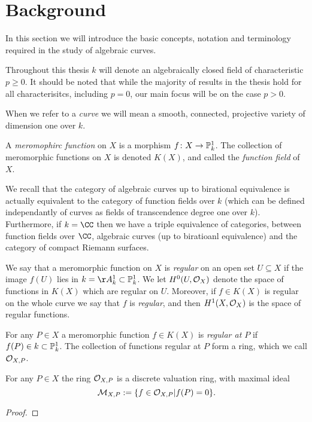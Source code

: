 \chapter{Background}\label{chapterbackground}

In this section we will introduce the basic concepts, notation and terminology required in the study of algebraic curves.

Throughout this thesis $k$ will denote an algebraically closed field of characteristic $p \geq 0$.
It should be noted that while the majority of results in the thesis hold for all characterisitcs, including $p=0$, our main focus will be on the case $p > 0$.

When we refer to a \emph{curve} we will mean a smooth, connected, projective variety of dimension one over $k$.


A \emph{meromophirc function} on $X$ is a morphism $f \colon X \rightarrow {\mathbb P}_k^1$.
The collection of meromorphic functions on $X$ is denoted $K(X)$, and called the \emph{function field} of $X$.

We recall that the category of algebraic curves up to birational  equivalence is actually equivalent to the category of function fields over $k$ (which can be defined independantly of curves as fields of transcendence degree one over $k$).
Furthermore, if $k = \CC$ then we have a triple equivalence of categories, between function fields over $\CC$, algebraic curves (up to biratioanl equivalence) and the category of compact Riemann surfaces.

We say that a meromorphic function on $X$ is \emph{regular} on an open set $U \subseteq X$ if the image $f(U)$ lies in $k = \AA_k^1 \subset \PP_k^1$.
We let $H^0(U,{\cal O}_X)$ denote the space of functions in $K(X)$ which are regular on $U$.
Moreover, if $f \in K(X)$ is regular on the whole curve we say that $f$ is \emph{regular}, and then $H^1(X,{\cal O}_X)$ is the space of regular functions.

For any $P \in X$ a meromorphic function $f \in K(X)$ is \emph{regular at $P$} if $f(P) \in k \subset {\mathbb P}_k^1$.
The collection of functions regular at $P$ form a ring, which we call ${\cal O}_{X,P}$.

    \begin{lem}
    For any $P \in X$ the ring ${\cal O}_{X,P}$ is a discrete valuation ring, with maximal ideal
        \[
        \mathcal {M}_{X,P} := \{ f \in {\cal O}_{X,P} | f(P) = 0 \}.
        \]
    \end{lem}
    \begin{proof}
    \end{proof}

